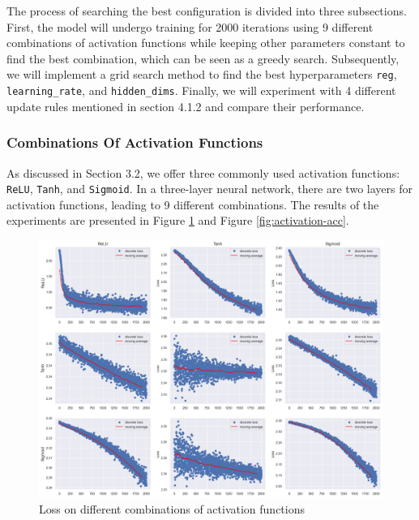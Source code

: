 \documentclass[10pt,a4paper,twoside]{tau}
\begin{document}
The process of searching the best configuration is divided into three subsections. First, the model will undergo training for 2000 iterations using 9 different combinations of activation functions while keeping other parameters constant to find the best combination, which can be seen as a greedy search. Subsequently, we will implement a grid search method to find the best hyperparameters \texttt{reg}, \texttt{learning\_rate}, and \texttt{hidden\_dims}. Finally, we will experiment with 4 different update rules mentioned in section 4.1.2 and compare their performance.


\subsubsection{Combinations Of Activation Functions}

As discussed in Section 3.2, we offer three commonly used activation functions: \texttt{ReLU}, \texttt{Tanh}, and \texttt{Sigmoid}. In a three-layer neural network, there are two layers for activation functions, leading to 9 different combinations.  The results of the experiments are presented in Figure \ref{fig:activation-loss} and Figure \ref{fig:activation-acc}.


\begin{figure}[htbp]
    \centering
    \includegraphics[scale=0.21]{images/activation_loss.png}
    \caption{Loss on different combinations of activation functions}
    \label{fig:activation-loss}
\end{figure}
\end{document}
